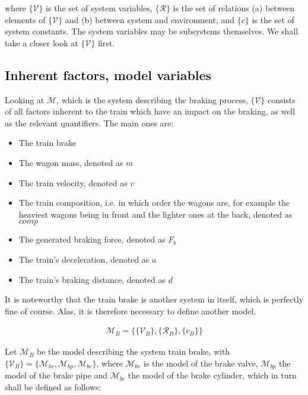 \noindent
where $\{{\mathcal {V}}\}$ is the set of system variables, $\{{\mathcal {R}}\}$ is the set of relations (a) between elements of $\{{\mathcal {V}}\}$ and (b) between system and environment, and $\{c\}$ is the set of system constants. The system variables may be subsystems themselves. We shall take a closer look at $\{{\mathcal {V}}\}$ first.

\subsection{Inherent factors, model variables}
\label{sec:InherentFactors}
\par\noindent
Looking at ${\mathcal{M}}$, which is the system describing the braking process, $\{{\mathcal {V}}\}$ consists of all factors inherent to the train which have an impact on the braking, as well as the relevant quantifiers. The main ones are:
\begin{itemize}
	\item The train brake
	\item The wagon mass, denoted as $m$
	\item The train velocity, denoted as $v$
	\item The train composition, i.e. in which order the wagons are, for example the heaviest wagons being in front and the lighter ones at the back, denoted as $comp$
	\item The generated braking force, denoted as $F_{b}$
	\item The train's deceleration, denoted as $a$
	\item The train's braking distance, denoted as $d$
\end{itemize}
\noindent
It is noteworthy that the train brake is another system in itself, which is perfectly fine of course. Alas, it is therefore necessary to define another model.

\begin{align*}
{\mathcal {M}}_{B} = \{ \{{\mathcal {V}}_{B}\}, \{{\mathcal{R}}_{B}\}, \{c_{B}\} \}
\end{align*}

\noindent
Let ${\mathcal{M}}_{B}$ be the model describing the system train brake, with $\{{\mathcal {V}}_{B}\} = \{ {\mathcal {M}}_{bv}, {\mathcal {M}}_{bp}, {\mathcal {M}}_{bc} \}$, where ${\mathcal {M}}_{bv}$ is the model of the brake valve, ${\mathcal {M}}_{bp}$ the model of the brake pipe and ${\mathcal {M}}_{bc}$ the model of the brake cylinder, which in turn shall be defined as follows:

